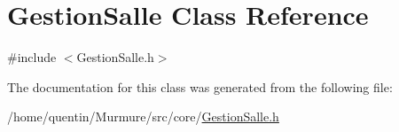 \hypertarget{classGestionSalle}{}\section{Gestion\+Salle Class Reference}
\label{classGestionSalle}


{\ttfamily \#include $<$Gestion\+Salle.\+h$>$}



The documentation for this class was generated from the following file\+:\begin{DoxyCompactItemize}
\item 
/home/quentin/\+Murmure/src/core/\hyperlink{GestionSalle_8h}{Gestion\+Salle.\+h}\end{DoxyCompactItemize}
